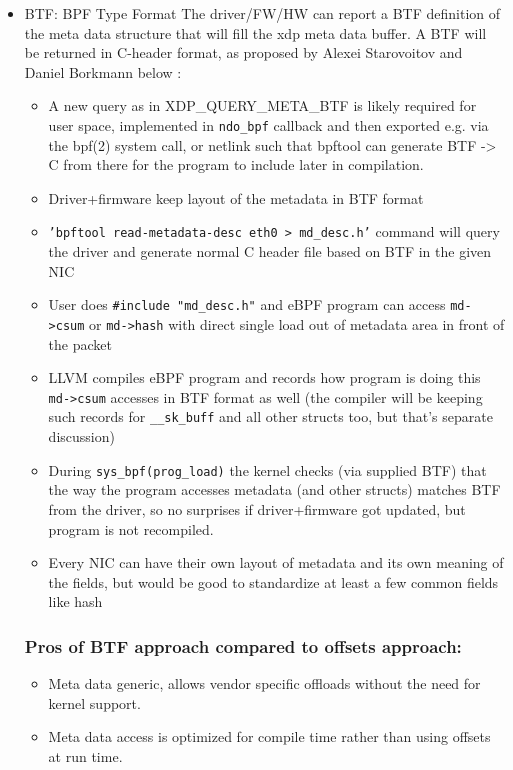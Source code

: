 \documentclass[letterpaper]{article}
\begin{document}
\begin{itemize}
\item BTF: BPF Type Format \cite{btf-patches-2018}
	The driver/FW/HW can report a BTF definition of the meta data structure that will fill the xdp meta data buffer. A BTF will be returned in C-header format, as proposed by Alexei Starovoitov and Daniel Borkmann \cite{mlx-rx-infra-patches-2018} below :
	\begin{itemize}
		\item A new query as in XDP\_QUERY\_META\_BTF is likely required for user space, implemented in \small{\texttt{ndo\_bpf}} callback and then exported e.g. via the bpf(2) system call, or netlink such that bpftool can generate BTF -> C from there for the program to include later in compilation.
		\item Driver+firmware keep layout of the metadata in BTF format
		\item \small{\texttt{'bpftool read-metadata-desc eth0 > md\_desc.h'}} command will query the driver and generate normal C header file based on BTF in the given NIC
		\item User does \small{\texttt{\#include "md\_desc.h"}} and eBPF program can access \small{\texttt{md->csum}} or \small{\texttt{md->hash}} with direct single load out of metadata area in front of the packet
		\item LLVM compiles eBPF program and records how program is doing this \small{\texttt{md->csum}} accesses in BTF format as well (the compiler will be keeping such records for \small{\texttt{\_\_sk\_buff}} and all other structs too, but that's separate discussion)
		\item During \small{\texttt{sys\_bpf(prog\_load)}} the kernel checks (via supplied BTF) that the way the program accesses metadata (and other structs) matches BTF from the driver, so no surprises if driver+firmware got updated, but program is not recompiled.
		\item Every NIC can have their own layout of metadata and its own meaning of the fields, but would be good to standardize at least a few common fields like hash
	\end{itemize}
  
\subsubsection{Pros of BTF approach compared to offsets approach:}
	\begin{itemize}
		\item Meta data generic, allows vendor specific offloads without the need for kernel support.
		\item Meta data access is optimized for compile time rather than using offsets at run time.
	\end{itemize}


\end{itemize}
\end{document}
